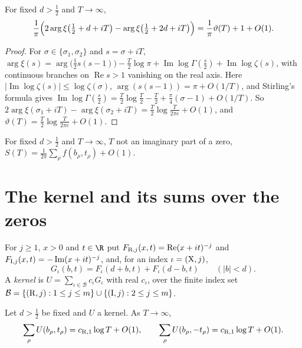 \begin{lemma}\label{lem:main_term}
For fixed $d>\frac12$ and $T\to\infty$,
\[
\frac1\pi\Bigl(2\arg\xi\bigl(\tfrac12+d+iT\bigr)-\arg\xi\bigl(\tfrac12+2d+iT\bigr)\Bigr)=\frac1\pi\vartheta(T)+1+O(1).
\]
\end{lemma}

\begin{proof}
For $\sigma\in\{\sigma_1,\sigma_2\}$ and $s=\sigma+iT$, $\arg\xi(s)=\arg\bigl(\tfrac12s(s-1)\bigr)-\tfrac T2\log\pi+\operatorname{Im}\log\Gamma(\tfrac s2)+\operatorname{Im}\log\zeta(s)$, with continuous branches on $\operatorname{Re}s>1$ vanishing on the real axis. Here $|\operatorname{Im}\log\zeta(s)|\le\log\zeta(\sigma)$, $\arg(s(s-1))=\pi+O(1/T)$, and Stirling's formula \cite[5.11.1]{DLMF} gives $\operatorname{Im}\log\Gamma(\frac s2)=\frac T2\log\frac T2-\frac T2+\frac\pi4(\sigma-1)+O(1/T)$. So $2\arg\xi(\sigma_1+iT)-\arg\xi(\sigma_2+iT)=\frac T2\log\frac T{2\pi e}+O(1)$, and $\vartheta(T)=\frac T2\log\frac T{2\pi e}+O(1)$.
\end{proof}

\begin{corollary}\label{cor:S_identity}
For fixed $d>\frac12$ and $T\to\infty$, $T$ not an imaginary part of a zero, $S(T)=\frac1{2\pi}\sum_\rho f(b_\rho,t_\rho)+O(1)$.
\end{corollary}

\section{The kernel and its sums over the zeros}\label{sec:kernel}

For $j\ge1$, $x>0$ and $t\in\R$ put $F_{{\rm R},j}(x,t)=\operatorname{Re}(x+it)^{-j}$ and $F_{{\rm I},j}(x,t)=-\operatorname{Im}(x+it)^{-j}$, and, for an index $\iota=({\rm X},j)$,
\begin{equation}
G_\iota(b,t)=F_\iota(d+b,t)+F_\iota(d-b,t)\qquad(|b|<d).
\label{eq:G_def}
\end{equation}
A \emph{kernel} is $U=\sum_{\iota\in\mathcal B}c_\iota G_\iota$ with real $c_\iota$, over the finite index set $\mathcal B=\{({\rm R},j):1\le j\le m\}\cup\{({\rm I},j):2\le j\le m\}$.

\begin{lemma}\label{lem:kernel_sums}
Let $d>\frac12$ be fixed and $U$ a kernel. As $T\to\infty$,
\[
\sum_\rho U(b_\rho,t_\rho)=c_{{\rm R},1}\log T+O(1),\qquad\sum_\rho U(b_\rho,-t_\rho)=c_{{\rm R},1}\log T+O(1).
\]
\end{lemma}

